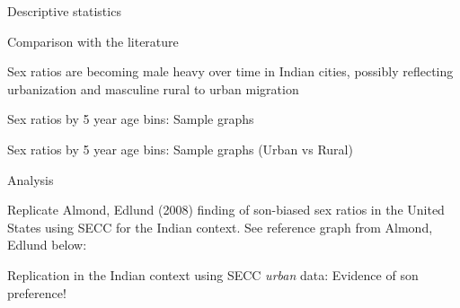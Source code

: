 \documentclass[aspectratio=169]{beamer}
\begin{document}
\begin{section}{Descriptive statistics}
\begin{frame}{Comparison with the literature}
  \centering
\end{frame}
\begin{frame}{Sex ratios are becoming male heavy over time in Indian
    cities, possibly reflecting urbanization and masculine rural to
    urban migration}
\centering
\end{frame}
\begin{frame}{Sex ratios by 5 year age bins: Sample graphs}
\centering
\end{frame}
\begin{frame}{Sex ratios by 5 year age bins: Sample graphs (Urban vs Rural)}
\centering
\end{frame}
\end{section}
\begin{section}{Analysis}
  \begin{frame}{Replicate Almond, Edlund (2008) finding of son-biased
      sex ratios in the United States using SECC for the Indian
      context. See reference graph from Almond, Edlund below: }
  \centering
  \end{frame}
\begin{frame}{Replication in the Indian context using SECC
    \emph{urban} data: Evidence of son preference!}
  \centering
  \end{frame}
\end{section}
\end{document}
